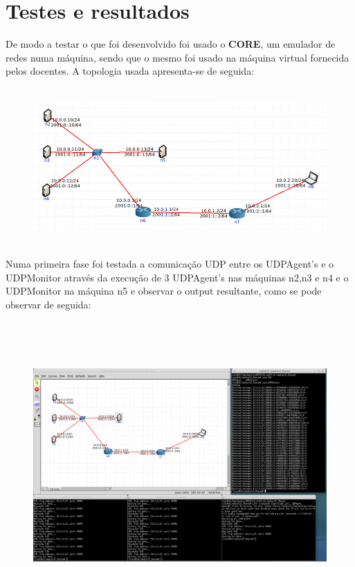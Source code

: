 \documentclass{article}
\begin{document}
\section{Testes e resultados}
De modo a testar o que foi desenvolvido foi usado o \textbf{CORE}, um emulador de redes numa máquina, sendo que o mesmo foi usado na máquina virtual fornecida pelos docentes. A topologia usada apresenta-se de seguida:
\begin{figure}[H]
	\centering
	\includegraphics[height=6cm]{topologia.png}
\end{figure}
Numa primeira fase foi testada a comunicação UDP entre os UDPAgent's e o UDPMonitor através da execução de 3 UDPAgent's nas máquinas n2,n3 e n4 e o UDPMonitor na máquina n5 e observar o output resultante, como se pode observar de seguida:
\begin{figure}[H]
	\advance\leftskip-2cm
    \includegraphics[height=11cm]{teste1.png}
\end{figure}
\end{document}
